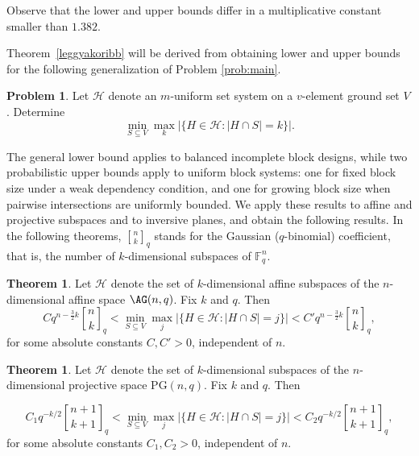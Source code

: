 \documentclass[10pt]{article}
\newcommand{\PG}{\mathrm{PG}}
\theoremstyle{definition}
\newtheorem{theorem}[thm]{Theorem}
\newtheorem{problem}[thm]{Problem}
\begin{document}
	
	\noindent Observe that the lower and upper bounds differ in a multiplicative constant smaller than $1.382$. 
	
	Theorem~\ref{leggyakoribb} will be derived from %
	obtaining lower and upper bounds for the following generalization of Problem \ref{prob:main}.
	\begin{problem} Let $\mathcal{H}$ denote an $m$-uniform  set system on a $v$-element ground set $V$. 
		Determine $$\min_{ S\subseteq V} \max_k |\{H\in \mathcal{H}: |H\cap S|=k\}|.$$
	\end{problem}
	
	The general lower bound applies to balanced incomplete block designs, while two probabilistic upper bounds apply to uniform block systems: one for fixed block size under a weak dependency condition, and one for growing block size when pairwise intersections are uniformly bounded. We apply these results to affine and projective subspaces and to inversive planes, and obtain the following results.
	In the following theorems, ${n\brack k}_q$ stands for the Gaussian ($q$-binomial) coefficient, that is, the number of \(k\)-dimensional
	subspaces of \(\mathbb F_q^n\).
	\begin{theorem}\label{affin_result} Let $\mathcal{H}$ denote the set of  $k$-dimensional affine subspaces of the $n$-dimensional affine space $\AG(n,q)$. Fix $k$ and $q$. Then $$C q^{n-\frac{3}{2}k}{n\brack k}_q<\min_{ S\subseteq V} \max_j |\{H\in \mathcal{H}: |H\cap S|=j\}|<C' q^{n-\frac{3}{2}k}{n\brack k}_q,$$
		for some  absolute constants $C, C'>0$, independent of $n$.
	\end{theorem}
	
	\begin{theorem}\label{proj_result}
		Let $\mathcal{H}$ denote the set of $k$-dimensional subspaces of the $n$-dimensional projective space $\PG(n,q)$.  Fix $k$ and $q$. Then 
		
		$$C_1q^{-k/2} {n+1\brack k+1}_q<\min_{ S\subseteq V} \max_j |\{H\in \mathcal{H}: |H\cap S|=j\}|< C_2q^{-k/2} {n+1\brack k+1}_q,$$ for some  absolute constants $C_1, C_2>0$, independent of  $n$.
	\end{theorem}
	
\end{document}
